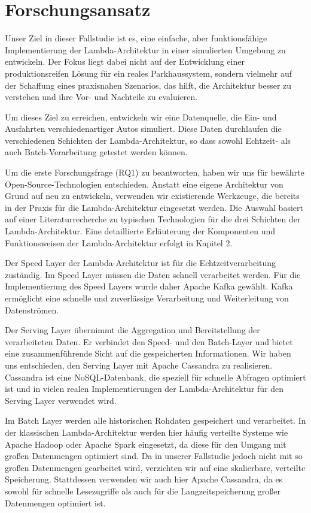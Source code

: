 \section{Forschungsansatz}
Unser Ziel in dieser Fallstudie ist es, eine einfache, aber funktionsfähige Implementierung der Lambda-Architektur in einer simulierten Umgebung zu entwickeln. Der Fokus liegt dabei nicht auf der Entwicklung einer produktionsreifen Lösung für ein reales Parkhaussystem, sondern vielmehr auf der Schaffung eines praxisnahen Szenarios, das hilft, die Architektur besser zu verstehen und ihre Vor- und Nachteile zu evaluieren.

Um dieses Ziel zu erreichen, entwickeln wir eine Datenquelle, die Ein- und Ausfahrten verschiedenartiger Autos simuliert.
Diese Daten durchlaufen die verschiedenen Schichten der Lambda-Architektur, so dass sowohl Echtzeit- als auch Batch-Verarbeitung getestet werden können.

Um die erste Forschungsfrage (RQ1) zu beantworten, haben wir uns für bewährte Open-Source-Technologien entschieden.
Anstatt eine eigene Architektur von Grund auf neu zu entwickeln, verwenden wir existierende Werkzeuge, die bereits in der Praxis für die Lambda-Architektur eingesetzt werden. Die Auswahl basiert auf einer Literaturrecherche zu typischen Technologien für die drei Schichten der Lambda-Architektur. Eine detaillierte Erläuterung der Komponenten und Funktionsweisen der Lambda-Architektur erfolgt in Kapitel 2.

Der Speed Layer der Lambda-Architektur ist für die Echtzeitverarbeitung zuständig. Im Speed Layer müssen die Daten schnell verarbeitet werden. Für die Implementierung des Speed Layers wurde daher Apache Kafka gewählt. Kafka ermöglicht eine schnelle und zuverlässige Verarbeitung und Weiterleitung von Datenströmen.

Der Serving Layer übernimmt die Aggregation und Bereitstellung der verarbeiteten Daten. Er verbindet den Speed- und den Batch-Layer und bietet eine zusammenführende Sicht auf die gespeicherten Informationen. Wir haben uns entschieden, den Serving Layer mit Apache Cassandra zu realisieren. Cassandra ist eine NoSQL-Datenbank, die speziell für schnelle Abfragen optimiert ist und in vielen realen Implementierungen der Lambda-Architektur für den Serving Layer verwendet wird.

Im Batch Layer werden alle historischen Rohdaten gespeichert und verarbeitet. In der klassischen Lambda-Architektur werden hier häufig verteilte Systeme wie Apache Hadoop oder Apache Spark eingesetzt, da diese für den Umgang mit großen Datenmengen optimiert sind. Da in unserer Fallstudie jedoch nicht mit so großen Datenmengen gearbeitet wird, verzichten wir auf eine skalierbare, verteilte Speicherung. Stattdessen verwenden wir auch hier Apache Cassandra, da es sowohl für schnelle Lesezugriffe als auch für die Langzeitspeicherung großer Datenmengen optimiert ist. 


